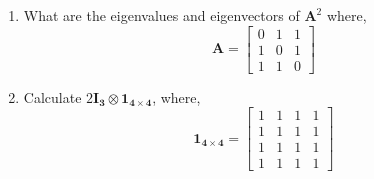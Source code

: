 \documentclass[12pt,a4paper]{article} %
\begin{document}
\begin{enumerate}
\item What are the eigenvalues and eigenvectors of $\mathbf{A}^2$ where,
\[
\mathbf{A}=
\begin{bmatrix}
0 & 1 & 1\\
1 & 0 & 1\\
1 & 1 & 0
\end{bmatrix}
\]

\item Calculate $2\mathbf{I_3}\otimes \mathbf{1_{4\times 4}}$, where,
\[
\mathbf{1_{4\times 4}}=
\begin{bmatrix}
1 & 1 & 1 & 1\\
1 & 1 & 1 & 1\\
1 & 1 & 1 & 1\\
1 & 1 & 1 & 1
\end{bmatrix}
\]
\end{enumerate}
\end{document}
